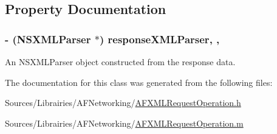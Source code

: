 \subsection{Property Documentation}
\hypertarget{interface_a_f_x_m_l_request_operation_ac30bf93cf79e7859bd62e480f320af55}{
\subsubsection[{response\-X\-M\-L\-Parser}]{\setlength{\rightskip}{0pt plus 5cm}-\/ (N\-S\-X\-M\-L\-Parser $\ast$) response\-X\-M\-L\-Parser\hspace{0.3cm}{\ttfamily [read]}, {\ttfamily [nonatomic]}, {\ttfamily [strong]}}}\label{interface_a_f_x_m_l_request_operation_ac30bf93cf79e7859bd62e480f320af55}
An {\ttfamily N\-S\-X\-M\-L\-Parser} object constructed from the response data. 

The documentation for this class was generated from the following files\-:\begin{DoxyCompactItemize}
\item 
Sources/\-Librairies/\-A\-F\-Networking/\hyperlink{_a_f_x_m_l_request_operation_8h}{A\-F\-X\-M\-L\-Request\-Operation.\-h}\item 
Sources/\-Librairies/\-A\-F\-Networking/\hyperlink{_a_f_x_m_l_request_operation_8m}{A\-F\-X\-M\-L\-Request\-Operation.\-m}\end{DoxyCompactItemize}
